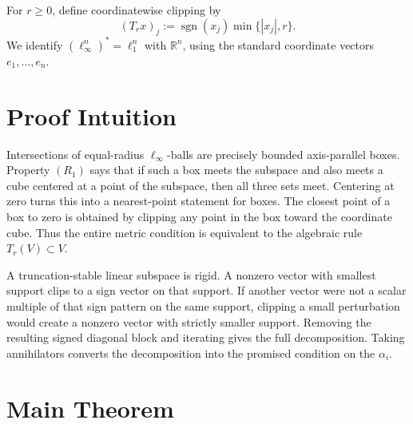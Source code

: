 \documentclass[11pt]{article}
\theoremstyle{definition}
\newcommand{\R}{\mathbb R}
\newcommand{\sgn}{\operatorname{sgn}}
\begin{document}
For \(r\ge0\), define coordinatewise clipping by
\[
 (T_r x)_j:=\sgn(x_j)\min\{|x_j|,r\}.
\]
We identify \((\ell_\infty^n)^*=\ell_1^n\) with \(\R^n\), using the
standard coordinate vectors \(e_1,\ldots,e_n\).

\section{Proof Intuition}

Intersections of equal-radius \(\ell_\infty\)-balls are precisely bounded
axis-parallel boxes.  Property \((R_1)\) says that if such a box meets the
subspace and also meets a cube centered at a point of the subspace, then all
three sets meet.  Centering at zero turns this into a nearest-point statement
for boxes.  The closest point of a box to zero is obtained by clipping any
point in the box toward the coordinate cube.  Thus the entire metric condition
is equivalent to the algebraic rule \(T_r(V)\subset V\).

A truncation-stable linear subspace is rigid.  A nonzero vector with smallest
support clips to a sign vector on that support.  If another vector were not a
scalar multiple of that sign pattern on the same support, clipping a small
perturbation would create a nonzero vector with strictly smaller support.
Removing the resulting signed diagonal block and iterating gives the full
decomposition.  Taking annihilators converts the decomposition into the
promised condition on the \(\alpha_i\).

\section{Main Theorem}
\end{document}

